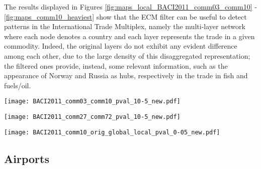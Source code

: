 \documentclass[aps,twocolumn,superscriptaddress]{revtex4-1}
\begin{document}
The results displayed in Figures \ref{fig:maps_local_BACI2011_comm03_comm10} - \ref{fig:maps_comm10_heaviest} show that the ECM filter can be useful to detect patterns in the International Trade Multiplex, namely the multi-layer network where each node denotes a country and each layer represents the trade in a given commodity. Indeed, the original layers do not exhibit any evident difference among each other, due to the large density of this disaggregated representation; the filtered ones provide, instead, some relevant information, such as the appearance of Norway and Russia as hubs, respectively in the trade in fish and fuels/oil. 

% 
\begin{figure*}[h!]
\centering
%
\texttt{[image: BACI2011\_comm03\_comm10\_pval\_10-5\_new.pdf]}
%
\caption{Original and ECM filtered trade multiplex of fish and cereals. Panels a-c refer to the original (a) and local ECM filter (c) fish and crustaceans commodity. Panels b-d account for cereals, instead. The original networks are built using the 2011 data, and have been filtered considering $\widetilde{\gamma} = 10^{-5}$.}
\label{fig:maps_local_BACI2011_comm03_comm10}
\end{figure*}
% 
\newpage
% 
\begin{figure*}[h!]
\centering
%
\texttt{[image: BACI2011\_comm27\_comm72\_pval\_10-5\_new.pdf]}
%
\caption{Original (panels a-b) and ECM filtered (panels c-d) trade multiplex of fuels and oils (panels a-c) and iron and steel (panels b-d). The original networks are built using the 2011 data, and have been filtered considering $\widetilde{\gamma} = 10^{-5}$.}
\label{fig:maps_local_BACI2011_comm27_comm72}
\end{figure*}
% 
\begin{figure*}[h!]
\centering
%
\texttt{[image: BACI2011\_comm10\_orig\_global\_local\_pval\_0-05\_new.pdf]}
%
\caption{Visual representation of the 200 heaviest links in the original network (a), ECM global (b) and local (c) filters for the 2011 Trade in cereals. The local filtering is obtained using $\widetilde{\gamma} = 0.05$, the global one is constructed such that $L_{GLOB} = L_{LOC}$.}
\label{fig:maps_comm10_heaviest}
\end{figure*}
% 

\newpage

\subsection{Airports}
\end{document}
